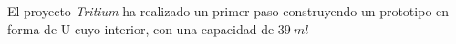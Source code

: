 El proyecto \textit{Tritium} ha realizado un primer paso construyendo un prototipo en forma de U cuyo interior, con una capacidad de $39~ml$